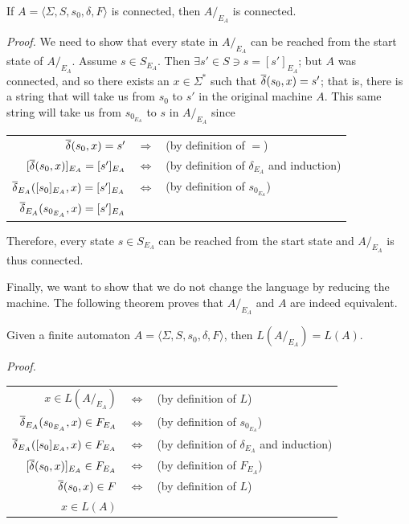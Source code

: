 \begin{thm}\label{thm-3.5}
If $A =\langle\Sigma,S,s_0,\delta,F\rangle$ is connected, then $A/_{E_A}$ is
connected.

\emph{Proof.} We need to show that every state in $A/_{E_A}$ can be reached from
the start state of $A/_{E_A}$. Assume $s \in S_{E_A}$. Then
$\exists s' \in S \ni s = [s']_{E_A}$; but $A$ was connected, and so there
exists an $x \in \Sigma^*$ such that $\overline{\delta}(s_0,x) = s'$; that is, there is a
string that will take us from $s_0$ to $s'$ in the original machine $A$. This
same string will take us from $s_{0_{E_A}}$ to $s$ in $A/_{E_A}$ since
\begin{center}
\begin{tabular}{rcl}
$\overline{\delta}(s_0,x) = s'$ & $\Rightarrow$ & (by definition of $=$) \\
$[\overline{\delta}(s_0,x)]_{E_A} = [s']_{E_A}$ & $\Leftrightarrow$ &
	(by definition of $\delta_{E_A}$ and induction) \\
$\overline{\delta}_{E_A}([s_0]_{E_A},x) = [s']_{E_A}$ & $\Leftrightarrow$ &
	(by definition of $s_{0_{E_A}}$) \\
$\overline{\delta}_{E_A}(s_{0_{E_A}},x) = [s']_{E_A}$ &&
\end{tabular}
\end{center}
Therefore, every state $s \in S_{E_A}$ can be reached from the start state and
$A/_{E_A}$ is thus connected.
\end{thm}

Finally, we want to show that we do not change the language by reducing the
machine. The following theorem proves that $A/_{E_A}$ and $A$ are indeed
equivalent.

\begin{thm}\label{thm-3.6}
Given a finite automaton $A =\langle\Sigma,S,s_0,\delta,F\rangle$, then
$L(A/_{E_A}) = L(A)$.

\emph{Proof.}
\begin{center}
\begin{tabular}{rcl}
$x \in L(A/_{E_A})$ & $\Leftrightarrow$ & (by definition of $L$) \\
$\overline{\delta}_{E_A}(s_{0_{E_A}},x) \in F_{E_A}$ & $\Leftrightarrow$ &
	(by definition of $s_{0_{E_A}}$) \\
$\overline{\delta}_{E_A}([s_0]_{E_A},x) \in F_{E_A}$ & $\Leftrightarrow$ &
	(by definition of $\delta_{E_A}$ and induction) \\
$[\overline{\delta}(s_0,x)]_{E_A} \in F_{E_A}$ & $\Leftrightarrow$ &
	(by definition of $F_{E_A}$) \\
$\overline{\delta}(s_0,x) \in F$ & $\Leftrightarrow$ & (by definition of $L$) \\
$x \in L(A)$ &&
\end{tabular}
\end{center}
\end{thm}

